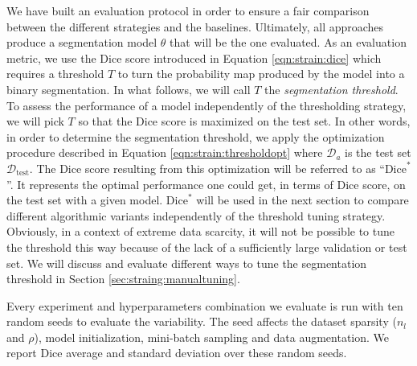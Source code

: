 We have built an evaluation protocol in order to ensure a fair comparison between the different strategies and the baselines. Ultimately, all approaches produce a segmentation model $\theta$ that will be the one evaluated. As an evaluation metric, we use the Dice score introduced in Equation \ref{eqn:strain:dice} which requires a threshold $T$ to turn the probability map produced by the model into a binary segmentation. In what follows, we will call $T$ the {\it segmentation threshold}. To assess the performance of a model independently of the thresholding strategy, we will pick $T$ so that the Dice score is maximized on the test set. In other words, in order to determine the segmentation threshold, we apply the optimization procedure described in Equation \ref{eqn:strain:thresholdopt} where $\mathcal{D}_a$ is the test set $\mathcal{D}_{\text{test}}$. The Dice score resulting from this optimization will be referred to as ``$\text{Dice}^*$''. It represents the optimal performance one could get, in terms of Dice score, on the test set with a given model. $\text{Dice}^*$ will be used in the next section to compare different algorithmic variants independently of the threshold tuning strategy. Obviously, in a context of extreme data scarcity, it will not be possible to tune the threshold this way because of the lack of a sufficiently large validation or test set. We will discuss and evaluate different ways to tune the segmentation threshold in Section \ref{sec:straing:manualtuning}.


Every experiment and hyperparameters combination we evaluate is run with ten random seeds to evaluate the variability. The seed affects the dataset sparsity ($n_l$ and $\rho$), model initialization, mini-batch sampling and data augmentation. We report Dice average and standard deviation over these random seeds.  


